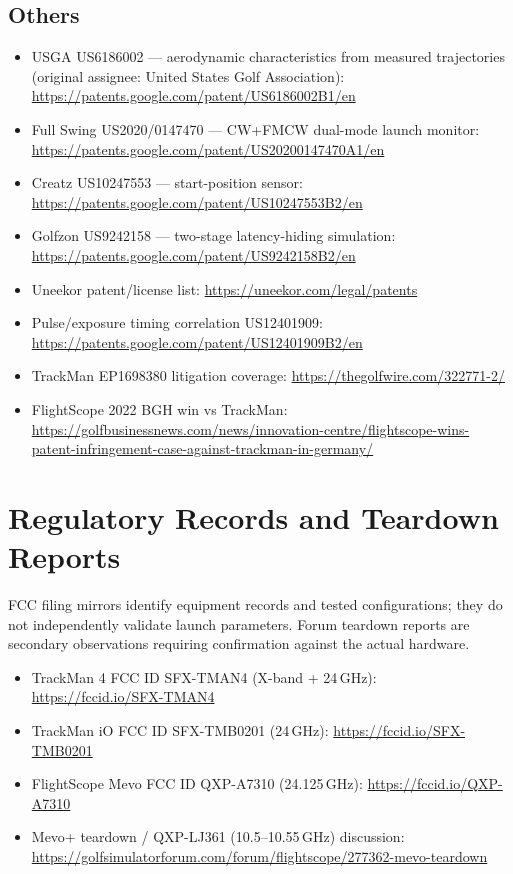 \subsection*{Others}
\begin{itemize}\small
\item USGA US6186002 --- aerodynamic characteristics from measured
  trajectories (original assignee: United States Golf Association):
  \url{https://patents.google.com/patent/US6186002B1/en}
\item Full Swing US2020/0147470 --- CW+FMCW dual-mode launch monitor:
  \url{https://patents.google.com/patent/US20200147470A1/en}
\item Creatz US10247553 --- start-position sensor:
  \url{https://patents.google.com/patent/US10247553B2/en}
\item Golfzon US9242158 --- two-stage latency-hiding simulation:
  \url{https://patents.google.com/patent/US9242158B2/en}
\item Uneekor patent/license list: \url{https://uneekor.com/legal/patents}
\item Pulse/exposure timing correlation US12401909:
  \url{https://patents.google.com/patent/US12401909B2/en}
\item TrackMan EP1698380 litigation coverage:
  \url{https://thegolfwire.com/322771-2/}
\item FlightScope 2022 BGH win vs TrackMan:
  \url{https://golfbusinessnews.com/news/innovation-centre/flightscope-wins-patent-infringement-case-against-trackman-in-germany/}
\end{itemize}

\section{Regulatory Records and Teardown Reports}
FCC filing mirrors identify equipment records and tested configurations;
they do not independently validate launch parameters. Forum teardown reports
are secondary observations requiring confirmation against the actual hardware.
\begin{itemize}\small
\item TrackMan 4 FCC ID SFX-TMAN4 (X-band + 24\,GHz):
  \url{https://fccid.io/SFX-TMAN4}
\item TrackMan iO FCC ID SFX-TMB0201 (24\,GHz):
  \url{https://fccid.io/SFX-TMB0201}
\item FlightScope Mevo FCC ID QXP-A7310 (24.125\,GHz):
  \url{https://fccid.io/QXP-A7310}
\item Mevo+ teardown / QXP-LJ361 (10.5--10.55\,GHz) discussion:
  \url{https://golfsimulatorforum.com/forum/flightscope/277362-mevo-teardown}
\end{itemize}


